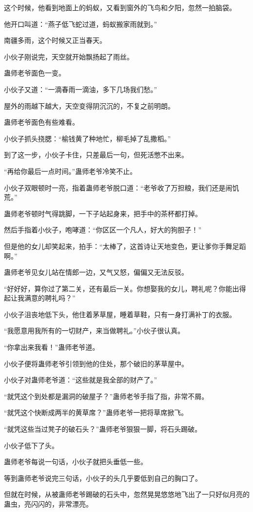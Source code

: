 \begin{this_body}
这个时候，他看到地面上的蚂蚁，又看到窗外的飞鸟和夕阳，忽然一拍脑袋。

他开口叫道：“燕子低飞蛇过道，蚂蚁搬家雨就到。”

南疆多雨，这个时候又正当春天。

小伙子刚说完，天空就开始飘扬起了雨丝。

蛊师老爷面色一变。

小伙子又道：“一滴春雨一滴油，多下几场我们愁。”

屋外的雨越下越大，天空变得阴沉沉的，不复之前明朗。

蛊师老爷面色有些难看。

小伙子抓头挠腮：“榆钱黄了种地忙，柳毛掉了乱撒稻。”

到了这一步，小伙子卡住，只差最后一句，但死活憋不出来。

“再给你最后一点时间。”蛊师老爷冷笑不止。

小伙子双眼顿时一亮，指着蛊师老爷脱口道：“老爷收了万担粮，我们还是闹饥荒。”

蛊师老爷顿时气得跳脚，一下子站起身来，把手中的茶杯都打掉。

然后手指着小伙子，咆哮道：“你区区一个凡人，好大的狗胆子！”

但是他的女儿却笑起来，拍手：“太棒了，这首诗让天地变色，更让爹你手舞足蹈啊。”

蛊师老爷见女儿站在情郎一边，又气又怒，偏偏又无法反驳。

“好好好，算你过了第二关，还有最后一关。你想娶我的女儿，聘礼呢？你能出得起让我满意的聘礼吗？”

小伙子沮丧地低下头，他住着茅草屋，睡着草鞋，只有一身打满补丁的衣服。

“我愿意用我所有的一切财产，来当做聘礼。”小伙子很认真。

“你拿出来我看！”蛊师老爷道。

小伙子便将蛊师老爷引领到他的住处，那个破旧的茅草屋中。

小伙子对蛊师老爷道：“这些就是我全部的财产了。”

“就凭这个到处都是漏洞的破屋子？”蛊师老爷手指了指，非常不屑。

“就凭这个快断成两半的黄草席？”蛊师老爷一把将草席掀飞。

“就凭这些当过凳子的破石头？”蛊师老爷狠狠一脚，将石头踢破。

小伙子低下了头。

蛊师老爷每说一句话，小伙子就把头垂低一些。

等到蛊师老爷说完三句话，小伙子的头几乎要低到自己的胸口了。

但就在时候，从被蛊师老爷踢破的石头中，忽然晃晃悠悠地飞出了一只好似月亮的蛊虫，亮闪闪的，非常漂亮。


\end{this_body}
